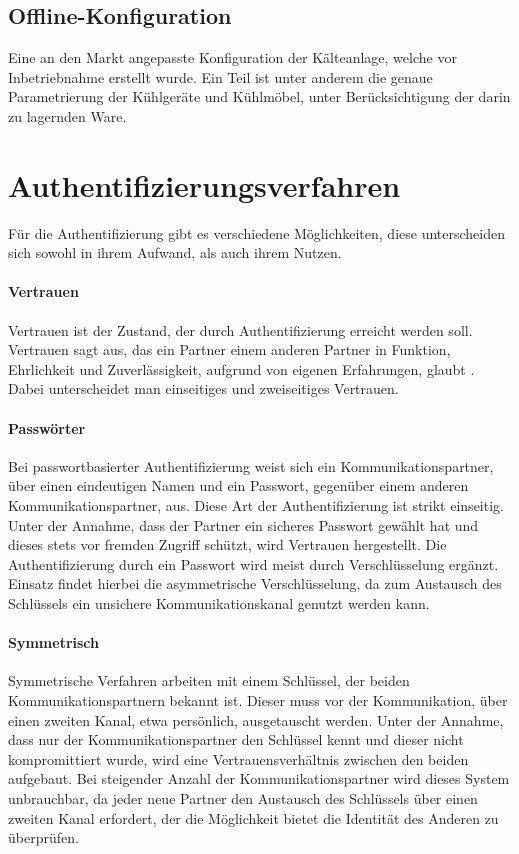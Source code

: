 \documentclass[11pt,a4paper]{report}
\begin{document}
\subsection{Offline-Konfiguration} Eine an den Markt angepasste Konfiguration der Kälteanlage, welche vor Inbetriebnahme erstellt wurde. Ein Teil ist unter anderem die genaue Parametrierung der Kühlgeräte und Kühlmöbel, unter Berücksichtigung der darin zu lagernden Ware.

\section{Authentifizierungsverfahren}

Für die Authentifizierung gibt es verschiedene Möglichkeiten, diese unterscheiden sich sowohl in ihrem Aufwand, als auch ihrem Nutzen.

\paragraph{Vertrauen}

Vertrauen ist der Zustand, der durch Authentifizierung erreicht werden soll. Vertrauen sagt aus, das ein Partner einem anderen Partner in Funktion, Ehrlichkeit und Zuverlässigkeit, aufgrund von eigenen Erfahrungen, glaubt \cite{chen}. Dabei unterscheidet man einseitiges und zweiseitiges Vertrauen. 

\paragraph{Passwörter}

Bei passwortbasierter Authentifizierung weist sich ein Kommunikationspartner, über einen eindeutigen Namen und ein Passwort, gegenüber einem anderen Kommunikationspartner, aus. Diese Art der Authentifizierung ist strikt einseitig. Unter der Annahme, dass der Partner ein sicheres Passwort gewählt hat und dieses stets vor fremden Zugriff schützt, wird Vertrauen hergestellt. Die Authentifizierung durch ein Passwort wird meist durch Verschlüsselung ergänzt. Einsatz findet hierbei die asymmetrische Verschlüsselung, da zum Austausch des Schlüssels ein unsichere Kommunikationskanal genutzt werden kann.

\paragraph{Symmetrisch}

Symmetrische Verfahren arbeiten mit einem Schlüssel, der beiden Kommunikationspartnern bekannt ist. Dieser muss vor der Kommunikation, über einen zweiten Kanal, etwa persönlich, ausgetauscht werden. Unter der Annahme, dass nur der Kommunikationspartner den Schlüssel kennt und dieser nicht kompromittiert wurde, wird eine Vertrauensverhältnis zwischen den beiden aufgebaut. Bei steigender Anzahl der Kommunikationspartner wird dieses System unbrauchbar, da jeder neue Partner den Austausch des Schlüssels über einen zweiten Kanal erfordert, der die Möglichkeit bietet die Identität des Anderen zu überprüfen.
\end{document}
